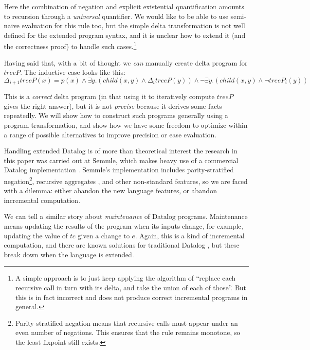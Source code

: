 Here the combination of negation and explicit existential quantification amounts
to recursion through a \emph{universal} quantifier. We would
like to be able to use semi-naive evaluation for this rule too, but the simple delta
transformation is not well defined for the extended program syntax, and it is unclear how to extend it (and the
correctness proof) to handle such cases.\footnote{A simple approach is to just
  keep applying the algorithm of ``replace each recursive call in turn with its
  delta, and take the union of each of those''. But this is in fact incorrect
  and does not produce correct incremental programs in general.}

Having said that, with a bit of thought we \emph{can} manually create delta program for $treeP$.
The inductive case looks like this:
\begin{displaymath}
  \Delta_{i+1}treeP(x) = p(x) \wedge \exists y. (child(x, y) \wedge
  \Delta_itreeP(y)) \wedge \neg \exists y. (child(x,y) \wedge \neg treeP_i(y))
\end{displaymath}

This is a \emph{correct} delta program (in that using it to iteratively compute
$treeP$ gives the right answer), but it is not \emph{precise} because it
derives some facts repeatedly. We will show how to construct such programs generally using a program
transformation, and show how we have some freedom to optimize within a range of
possible alternatives to improve precision or ease evaluation.

Handling extended Datalog is of more than theoretical interest \textemdash{} the research
in this paper was carried out at Semmle, which
makes heavy use of a commercial Datalog implementation
\autocites{semmleWebsite}{avgustinov2016ql}{sereni2008adding}{schafer2010type}.
Semmle's implementation includes parity-stratified negation\footnote{Parity-stratified negation means that recursive calls must
  appear under an even number of negations. This ensures that the rule remains
  monotone, so the least fixpoint still exists.},
recursive aggregates \autocite{demoor2013aggregates}, and other non-standard
features, so we are faced with a dilemma: either abandon the new language
features, or abandon incremental computation.

We can tell a similar story about \emph{maintenance} of Datalog programs.
Maintenance means updating the results of the program when its inputs change,
for example, updating the value of $tc$ given a change to $e$. Again, this is a
kind of incremental computation, and there are known solutions for traditional Datalog
\autocite{gupta1993maintaining}, but these break down when the language is extended.

